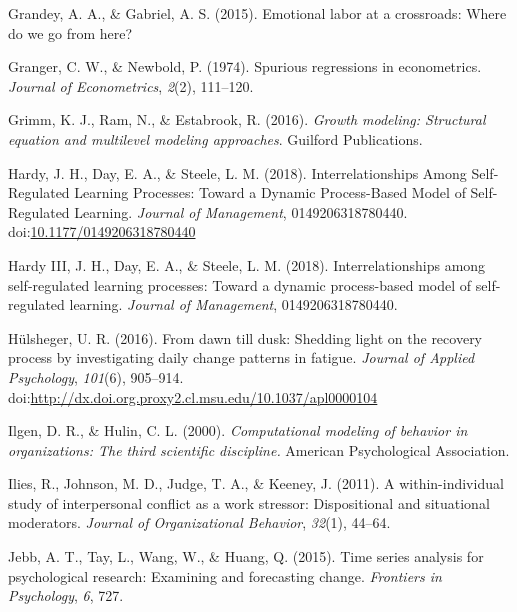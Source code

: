 \documentclass[english,,man]{apa6}
\theoremstyle{definition}
\theoremstyle{definition}
\theoremstyle{definition}
\theoremstyle{remark}
\begin{document}
\leavevmode\hypertarget{ref-grandey2015emotional}{}%
Grandey, A. A., \& Gabriel, A. S. (2015). Emotional labor at a
crossroads: Where do we go from here?

\leavevmode\hypertarget{ref-granger_spurious_1974}{}%
Granger, C. W., \& Newbold, P. (1974). Spurious regressions in
econometrics. \emph{Journal of Econometrics}, \emph{2}(2), 111--120.

\leavevmode\hypertarget{ref-grimm_growth_2016}{}%
Grimm, K. J., Ram, N., \& Estabrook, R. (2016). \emph{Growth modeling:
Structural equation and multilevel modeling approaches}. Guilford
Publications.

\leavevmode\hypertarget{ref-hardy_interrelationships_2018}{}%
Hardy, J. H., Day, E. A., \& Steele, L. M. (2018). Interrelationships
Among Self-Regulated Learning Processes: Toward a Dynamic Process-Based
Model of Self-Regulated Learning. \emph{Journal of Management},
0149206318780440.
doi:\href{https://doi.org/10.1177/0149206318780440}{10.1177/0149206318780440}

\leavevmode\hypertarget{ref-hardy2018}{}%
Hardy III, J. H., Day, E. A., \& Steele, L. M. (2018).
Interrelationships among self-regulated learning processes: Toward a
dynamic process-based model of self-regulated learning. \emph{Journal of
Management}, 0149206318780440.

\leavevmode\hypertarget{ref-hulsheger_dawn_2016}{}%
Hülsheger, U. R. (2016). From dawn till dusk: Shedding light on the
recovery process by investigating daily change patterns in fatigue.
\emph{Journal of Applied Psychology}, \emph{101}(6), 905--914.
doi:\href{https://doi.org/http://dx.doi.org.proxy2.cl.msu.edu/10.1037/apl0000104}{http://dx.doi.org.proxy2.cl.msu.edu/10.1037/apl0000104}

\leavevmode\hypertarget{ref-ilgen_computational_2000}{}%
Ilgen, D. R., \& Hulin, C. L. (2000). \emph{Computational modeling of
behavior in organizations: The third scientific discipline.} American
Psychological Association.

\leavevmode\hypertarget{ref-ilies2011within}{}%
Ilies, R., Johnson, M. D., Judge, T. A., \& Keeney, J. (2011). A
within-individual study of interpersonal conflict as a work stressor:
Dispositional and situational moderators. \emph{Journal of
Organizational Behavior}, \emph{32}(1), 44--64.

\leavevmode\hypertarget{ref-jebb2015time}{}%
Jebb, A. T., Tay, L., Wang, W., \& Huang, Q. (2015). Time series
analysis for psychological research: Examining and forecasting change.
\emph{Frontiers in Psychology}, \emph{6}, 727.
\end{document}
